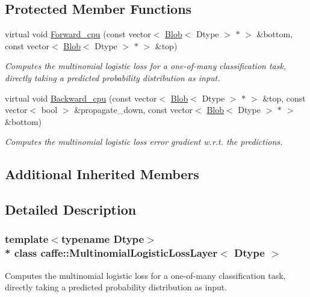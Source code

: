 \subsection*{Protected Member Functions}
\begin{DoxyCompactItemize}
\item 
virtual void \hyperlink{classcaffe_1_1MultinomialLogisticLossLayer_ac1b7b60b9439d9679664783a167a36d6}{Forward\+\_\+cpu} (const vector$<$ \hyperlink{classcaffe_1_1Blob}{Blob}$<$ Dtype $>$ $\ast$ $>$ \&bottom, const vector$<$ \hyperlink{classcaffe_1_1Blob}{Blob}$<$ Dtype $>$ $\ast$ $>$ \&top)
\begin{DoxyCompactList}\small\item\em Computes the multinomial logistic loss for a one-\/of-\/many classification task, directly taking a predicted probability distribution as input. \end{DoxyCompactList}\item 
virtual void \hyperlink{classcaffe_1_1MultinomialLogisticLossLayer_a93b273f7c2180dff92cbc8d4f5ba353d}{Backward\+\_\+cpu} (const vector$<$ \hyperlink{classcaffe_1_1Blob}{Blob}$<$ Dtype $>$ $\ast$ $>$ \&top, const vector$<$ bool $>$ \&propagate\+\_\+down, const vector$<$ \hyperlink{classcaffe_1_1Blob}{Blob}$<$ Dtype $>$ $\ast$ $>$ \&bottom)
\begin{DoxyCompactList}\small\item\em Computes the multinomial logistic loss error gradient w.\+r.\+t. the predictions. \end{DoxyCompactList}\end{DoxyCompactItemize}
\subsection*{Additional Inherited Members}


\subsection{Detailed Description}
\subsubsection*{template$<$typename Dtype$>$\\*
class caffe\+::\+Multinomial\+Logistic\+Loss\+Layer$<$ Dtype $>$}

Computes the multinomial logistic loss for a one-\/of-\/many classification task, directly taking a predicted probability distribution as input. 

